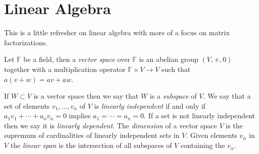 \section{Linear Algebra}

This is a little refresher on linear algebra with more of a focus on matrix factorizations.

\begin{defn}Let $\mathds{F}$ be a field, then a \emph{vector space} over $\mathds{F}$ is an abelian group $(V,+,0)$ together with 
a multiplication operator $\mathds{F} \times V \to V$ such that $a (v + w) = av + aw$.
\end{defn}

\begin{defn}If $W \subset V$ is a vector space then we say that $W$ is a \emph{subspace} of $V$.  We say that a set of elements  $v_1, \dotsc, v_n$ of $V$ is \emph{linearly independent} if and only if $a_1 v_1 + \dotsb + a_n v_n = 0$ implies
$a_1 = \dotsb = a_n = 0$.  If a set is not linearly independent then we say it is  \emph{linearly dependent}.  The \emph{dimension} of a vector space $V$ is the supremum of cardinalities of linearly independent sets in $V$.  Given elements $v_\alpha$ in $V$ the \emph{linear span} is the intersection of all subspaces of $V$ containing the $v_\alpha$.  
\end{defn}

